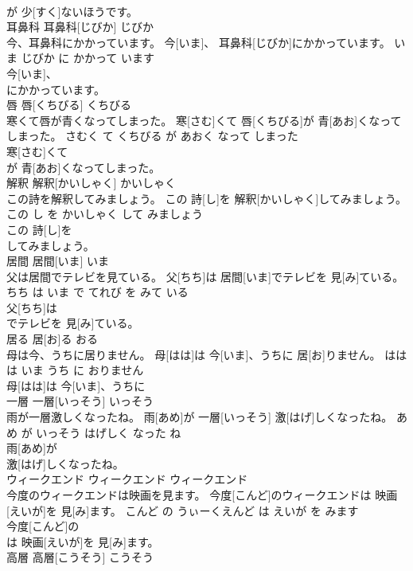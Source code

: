 \documentclass[8pt]{extreport}
\begin{document}
\begin{CJK}{UTF8}{min}
\\	が 少[すく]ないほうです。			
\\	耳鼻科	耳鼻科[じびか]	じびか	
\\	今、耳鼻科にかかっています。	今[いま]、 耳鼻科[じびか]にかかっています。	いま じびか に かかって います	
\\	今[いま]、
\\	にかかっています。			
\\	唇	唇[くちびる]	くちびる	
\\	寒くて唇が青くなってしまった。	寒[さむ]くて 唇[くちびる]が 青[あお]くなってしまった。	さむく て くちびる が あおく なって しまった	
\\	寒[さむ]くて
\\	が 青[あお]くなってしまった。			
\\	解釈	解釈[かいしゃく]	かいしゃく	
\\	この詩を解釈してみましょう。	この 詩[し]を 解釈[かいしゃく]してみましょう。	この し を かいしゃく して みましょう	
\\	この 詩[し]を
\\	してみましょう。			
\\	居間	居間[いま]	いま	
\\	父は居間でテレビを見ている。	父[ちち]は 居間[いま]でテレビを 見[み]ている。	ちち は いま で てれび を みて いる	
\\	父[ちち]は
\\	でテレビを 見[み]ている。			
\\	居る	居[お]る	おる	
\\	母は今、うちに居りません。	母[はは]は 今[いま]、うちに 居[お]りません。	はは は いま うち に おりません	
\\	母[はは]は 今[いま]、うちに
\\	一層	一層[いっそう]	いっそう	
\\	雨が一層激しくなったね。	雨[あめ]が 一層[いっそう] 激[はげ]しくなったね。	あめ が いっそう はげしく なった ね	
\\	雨[あめ]が
\\	激[はげ]しくなったね。			
\\	ウィークエンド	ウィークエンド	ウィークエンド	
\\	今度のウィークエンドは映画を見ます。	今度[こんど]のウィークエンドは 映画[えいが]を 見[み]ます。	こんど の うぃーくえんど は えいが を みます	
\\	今度[こんど]の
\\	は 映画[えいが]を 見[み]ます。			
\\	高層	高層[こうそう]	こうそう	

\end{CJK}
\end{document}
